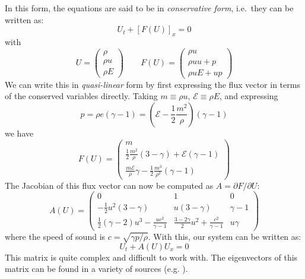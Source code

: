 In this form, the equations are said to be in {\em conservative form},
i.e.\ they can be written as:
\begin{equation}
U_t + \left [F(U) \right ]_x = 0
\end{equation}
with
\begin{equation}
U = \left ( \begin{array}{c} \rho \\ \rho u \\ \rho E \end{array} \right )
%
\qquad
%
F(U) = \left ( \begin{array}{c} \rho u \\ \rho uu + p \\ \rho u E + up \end{array} \right )
\end{equation}
%
We can write this in {\em quasi-linear} form by first expressing the flux
vector in terms of the conserved variables directly.  Taking
$m \equiv \rho u$, $\mathcal{E} \equiv \rho E$, and expressing
\begin{equation}
p = \rho e (\gamma-1) =  \left (\mathcal{E} - \frac{1}{2} \frac{m^2}{\rho}\right )(\gamma - 1)
\end{equation}
we have
\begin{equation}
F(U) = \left ( \begin{array}{c}
      m \\
      \frac{1}{2}\frac{m^2}{\rho} \left (3 - \gamma \right ) +
          \mathcal{E} (\gamma - 1) \\
      \frac{m\mathcal{E}}{\rho} \gamma -\frac{1}{2} \frac{m^3}{\rho^2} (\gamma -1) \end{array} \right )
\end{equation}
The Jacobian of this flux vector can now be computed as $A = \partial
F/\partial U$:
\begin{equation}
A(U) = \left ( \begin{array}{ccc}
   0  & 1 & 0 \\
   -\frac{1}{2}u^2(3 -\gamma) & u (3 -\gamma) & \gamma - 1 \\
   \frac{1}{2}(\gamma -2)u^3 - \frac{uc^2}{\gamma -1} &
       \frac{3-2\gamma}{2} u^2 + \frac{c^2}{\gamma -1} & u \gamma
  \end{array} \right )
\end{equation}
where the speed of sound is $c = \sqrt{\gamma p/\rho}$.   With this, our
system can be written as:
\begin{equation}
U_t + A(U) U_x = 0
\end{equation}
This matrix is quite complex and difficult to work with.  The
eigenvectors of this matrix can be found in a variety of sources
(e.g. \cite{toro:1997,athena}).


